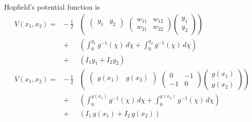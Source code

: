   Hopfield's potential function is 
\begin{eqnarray*}
V(x_1, x_2) = &-\,\displaystyle{\frac{1}{2}}& \left(
  \begin{matrix}\begin{pmatrix}y_1 & y_2\end{pmatrix}\\\mbox{}\end{matrix}
  \begin{pmatrix} w_{11} & w_{12} \\ w_{21} & w_{22} \end{pmatrix} 
  \begin{pmatrix} y_1 \\ y_2 \end{pmatrix} \right) \\
&+& \left(\int_0^{y_1} g^{-1}(\chi) \, d\chi 
       + \int_0^{y_2} g^{-1}(\chi) \, d\chi\right) \\
&+& \left(I_1 y_1 + I_2 y_2 \right) \\
V(x_1, x_2) = &-\,\displaystyle{\frac{1}{2}}& \left(
 \begin{matrix}\begin{pmatrix}g(x_1) & g(x_2)\end{pmatrix}\\\mbox{}\end{matrix}
 \begin{pmatrix} 0 & -1 \\ -1 & 0 \end{pmatrix} 
 \begin{pmatrix} g(x_1) \\ g(x_2) \end{pmatrix} \right) \\
&+& \left(\int_0^{g(x_1)} g^{-1}(\chi) \, d\chi 
       + \int_0^{g(x_2)} g^{-1}(\chi) \, d\chi\right) \\
&+& \left(I_1 \, g(x_1) + I_2 \, g(x_2) \right) 
\end{eqnarray*}

